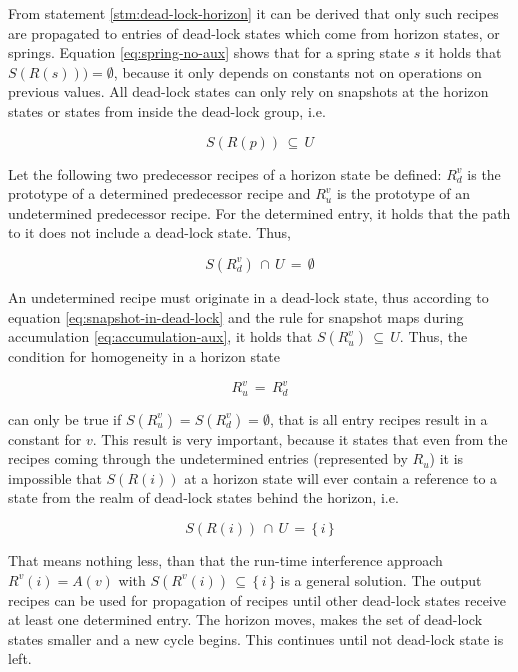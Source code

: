 \documentclass[12pt,a4paper]{scrartcl}
\begin{document}
From statement \ref{stm:dead-lock-horizon} it can be derived that only such
recipes are propagated to entries of dead-lock states which come from horizon
states, or springs.  Equation \eqref{eq:spring-no-aux} shows that for a spring
state $s$ it holds that $S(R(s)))=\emptyset$, because it only depends on
constants not on operations on previous values. All dead-lock states can only
rely on snapshots at the horizon states or states from inside the dead-lock
group, i.e.

\begin{equation} \label{eq:snapshot-in-dead-locks}
    S(R(p))\,\subseteq\,U
\end{equation}

Let the following two predecessor recipes of a horizon state be defined: $R^v_d$
is the prototype of a determined predecessor recipe and $R^v_u$ is the prototype
of an undetermined predecessor recipe. For the determined entry, it holds that
the path to it does not include a dead-lock state. Thus,

\begin{equation}
        S(R^v_d)\,\cap\,U\,=\,\emptyset
\end{equation}

An undetermined recipe must originate in a dead-lock state, thus according to
equation \eqref{eq:snapshot-in-dead-lock} and the rule for snapshot maps during
accumulation \eqref{eq:accumulation-aux}, it holds that
$S(R^v_u)\,\subseteq\,U$.  Thus, the condition for homogeneity in a horizon
state

\begin{equation} \label{eq:homogeneity-horizon-state}
    R^v_u\,=\,R^v_d
\end{equation}

can only be true if $S(R^v_u)=S(R^v_d)=\emptyset$, that is all entry recipes
result in a constant for $v$. This result is very important, because it states
that even from the recipes coming through the undetermined entries (represented
by $R_u$) it is impossible that $S(R(i))$ at a horizon state will ever contain
a reference to a state from the realm of dead-lock states behind the horizon,
i.e.

\begin{equation}
    S(R(i))\,\cap\,U\,=\,\{\,i\,\}
\end{equation}

That means nothing less, than that the run-time interference approach
$R^v(i)=A(v)$ with $S(R^v(i))\,\subseteq\,\{\,i\,\}$ is a general solution.
The output recipes can be used for propagation of recipes until other dead-lock
states receive at least one determined entry. The horizon moves, makes the
set of dead-lock states smaller and a new cycle begins. This continues until
not dead-lock state is left. 
\end{document}
